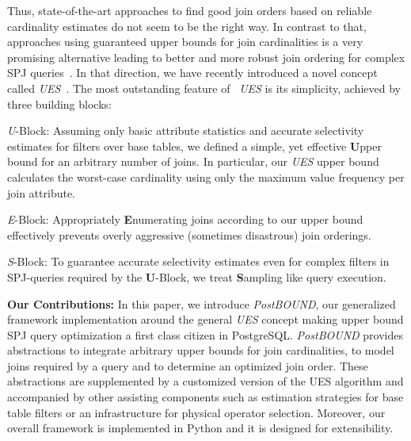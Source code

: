 Thus, state-of-the-art approaches to find good join orders based on reliable cardinality estimates do not seem to be the right way.
In contrast to that, approaches using guaranteed upper bounds for join cardinalities is a very promising alternative leading to better and more robust join ordering for complex SPJ queries~\cite{DBLP:conf/sigmod/CaiBS19,DBLP:journals/corr/abs-2201-04166,hertzschuch-21-ues}. 
In that direction, we have recently introduced a novel concept called \emph{UES}~\cite{hertzschuch-21-ues}. 
The most outstanding feature of ~\emph{UES} is its simplicity, achieved by three building blocks:
\begin{compactitem}
\item[\emph{U}-Block:] Assuming only basic attribute statistics and accurate selectivity estimates for filters over base tables, we defined a simple, yet effective \textbf{U}pper bound for an arbitrary number of joins. In particular, our \emph{UES} upper bound calculates the worst-case cardinality using only the maximum value frequency per join attribute. 
\item[\emph{E}-Block:] Appropriately \textbf{E}numerating joins according to our upper bound effectively prevents overly aggressive (sometimes disastrous) join orderings.
\item[\emph{S}-Block:] To guarantee accurate selectivity estimates even for complex filters in SPJ-queries required by the \textbf{U}-Block, we treat \textbf{S}ampling like query execution.
\end{compactitem}

\textbf{Our Contributions:} 
In this paper, we introduce \emph{PostBOUND}, our generalized framework implementation around the general \emph{UES} concept making upper bound SPJ query optimization a first class citizen in PostgreSQL. 
\emph{PostBOUND} provides abstractions to integrate arbitrary upper bounds for join cardinalities, to model joins required by a query and to determine an optimized join order.
These abstractions are supplemented by a customized version of the UES algorithm and accompanied by other assisting components such as estimation strategies for base table filters or an infrastructure for physical operator selection.
Moreover, our overall framework is implemented in Python and it is designed for extensibility.%

